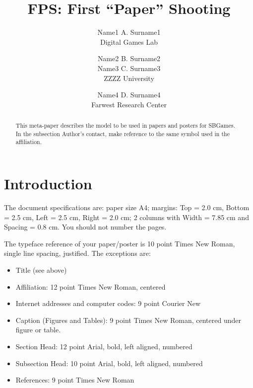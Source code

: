 \documentclass[a4paper]{sbgames}               %
\title{FPS: First ``Paper''  Shooting}
\author{Name1 A. Surname1\\ Digital Games Lab 
        \and Name2 B. Surname2\\ Name3 C. Surname3\\ ZZZZ University
        \and Name4 D. Surname4\\ Farwest Research Center 
}
\begin{document}


\maketitle


\begin{abstract}

  This meta-paper describes the model to be used in papers and posters
  for SBGames. In the subsection Author's contact, make reference to
  the same symbol used in the affiliation.
\end{abstract}

\keywordlist
\contactlist

\section{Introduction}

The document specifications are: paper size A4; margins: Top = 2.0 cm,
Bottom = 2.5 cm, Left = 2.5 cm, Right = 2.0 cm; 2 columns with Width =
7.85 cm and Spacing = 0.8 cm. You should not number the pages.

The typeface reference of your paper/poster is 10 point Times New
Roman, single line spacing, justified. The exceptions are:

\begin{itemize}

\item Title (see above)
\item Affiliation: 12 point Times New Roman, centered
\item Internet addresses and computer codes: 9 point Courier New
\item Caption (Figures and Tables): 9 point Times New Roman, centered under figure or table.
\item Section Head: 12 point Arial, bold, left aligned, numbered
\item Subsection Head: 10 point Arial, bold, left aligned, numbered
\item References: 9 point Times New Roman
\end{itemize}
\end{document}
